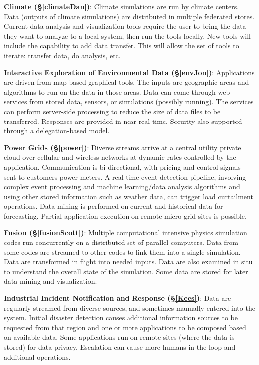 \documentclass[times]{cpeauth}
\begin{document}
{\bf Climate (\S\ref{climateDan})}: Climate simulations are run by climate
centers.  Data (outputs of climate simulations) are distributed in multiple
federated stores.  Current data analysis and visualization tools require the
user to bring the data they want to analyze to a local system, then run the
tools locally.  New tools will include the capability to add data transfer.
This will allow the set of tools to iterate: transfer data, do analysis, etc.

{\bf Interactive Exploration of Environmental Data (\S\ref{envJon})}:
Applications are driven from map-based graphical tools.  The inputs are
geographic areas and algorithms to run on the data in those areas. Data can come
through web services from stored data, sensors, or simulations (possibly
running).  The services can perform server-side processing to reduce the size of
data files to be transferred. Responses are provided in near-real-time.
Security also supported through a delegation-based model.

{\bf Power Grids (\S\ref{power})}: Diverse streams arrive at a central utility
private cloud over cellular and wireless networks at dynamic rates controlled by
the application. Communication is bi-directional, with pricing and control
signals sent to customers power meters.  A real-time event detection pipeline,
involving complex event processing and machine learning/data analysis algorithms
and using other stored information such as weather data, can trigger load
curtailment operations. Data mining is performed on current and historical data
for forecasting. Partial application execution on remote micro-grid sites is
possible.

{\bf Fusion (\S\ref{fusionScott})}: Multiple computational intensive physics
simulation codes run concurrently on a distributed set of parallel computers.
Data from some codes are streamed to other codes to link them into a single
simulation.  Data are transformed in flight into needed inputs.  Data are also
examined in situ to understand the overall state of the simulation.  Some data
are stored for later data mining and visualization.

{\bf Industrial Incident Notification and Response (\S\ref{Kees})}: Data are
regularly streamed from diverse sources, and sometimes manually entered into the
system. Initial disaster detection causes additional information sources to be
requested from that region and one or more applications to be composed based on
available data. Some applications run on remote sites (where the data is stored)
for data privacy. Escalation can cause more humans in the loop and additional
operations.
\end{document}
